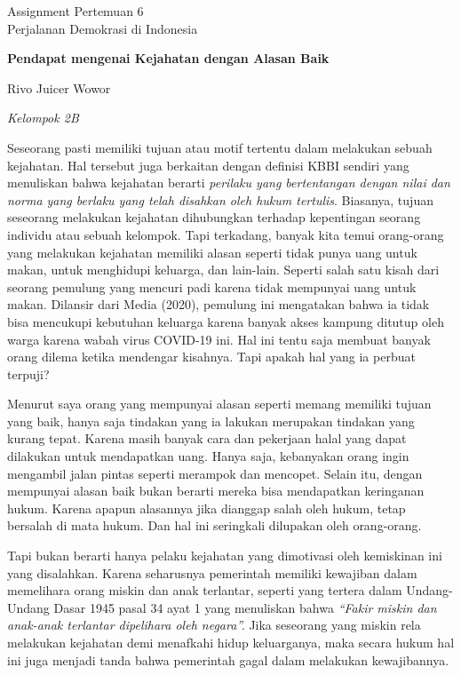 \documentclass[
  12pt  
]{article}
\newcommand{\mytitle}{Pendapat mengenai Kejahatan dengan Alasan Baik}
\newcommand{\theauthor}{Rivo Juicer Wowor}
\newcommand{\affiliation}{Kelompok 2B}
\begin{document}
\begin{titlepage}
  \vspace*{\fill}
  \centering
  Assignment Pertemuan 6 \\
  Perjalanan Demokrasi di Indonesia \par
  \vspace{0.5cm}
  \LARGE{\textbf{\mytitle}} \par
  \vspace{0.5cm}
  \large{\theauthor} \par
  \small{\emph{\affiliation}} \par
  \vfill
\end{titlepage}
Seseorang pasti memiliki tujuan atau motif tertentu dalam melakukan
sebuah kejahatan. Hal tersebut juga berkaitan dengan definisi KBBI
sendiri yang menuliskan bahwa kejahatan berarti \emph{perilaku yang
bertentangan dengan nilai dan norma yang berlaku yang telah disahkan
oleh hukum tertulis}. Biasanya, tujuan seseorang melakukan kejahatan
dihubungkan terhadap kepentingan seorang individu atau sebuah kelompok.
Tapi terkadang, banyak kita temui orang-orang yang melakukan kejahatan
memiliki alasan seperti tidak punya uang untuk makan, untuk menghidupi
keluarga, dan lain-lain. Seperti salah satu kisah dari seorang pemulung
yang mencuri padi karena tidak mempunyai uang untuk makan. Dilansir dari
Media (2020), pemulung ini mengatakan bahwa ia tidak bisa mencukupi
kebutuhan keluarga karena banyak akses kampung ditutup oleh warga karena
wabah virus COVID-19 ini. Hal ini tentu saja membuat banyak orang dilema
ketika mendengar kisahnya. Tapi apakah hal yang ia perbuat terpuji?

Menurut saya orang yang mempunyai alasan seperti memang memiliki tujuan
yang baik, hanya saja tindakan yang ia lakukan merupakan tindakan yang
kurang tepat. Karena masih banyak cara dan pekerjaan halal yang dapat
dilakukan untuk mendapatkan uang. Hanya saja, kebanyakan orang ingin
mengambil jalan pintas seperti merampok dan mencopet. Selain itu, dengan
mempunyai alasan baik bukan berarti mereka bisa mendapatkan keringanan
hukum. Karena apapun alasannya jika dianggap salah oleh hukum, tetap
bersalah di mata hukum. Dan hal ini seringkali dilupakan oleh
orang-orang.

Tapi bukan berarti hanya pelaku kejahatan yang dimotivasi oleh
kemiskinan ini yang disalahkan. Karena seharusnya pemerintah memiliki
kewajiban dalam memelihara orang miskin dan anak terlantar, seperti yang
tertera dalam Undang-Undang Dasar 1945 pasal 34 ayat 1 yang menuliskan
bahwa \emph{``Fakir miskin dan anak-anak terlantar dipelihara oleh
negara''.} Jika seseorang yang miskin rela melakukan kejahatan demi
menafkahi hidup keluarganya, maka secara hukum hal ini juga menjadi
tanda bahwa pemerintah gagal dalam melakukan kewajibannya.
\end{document}
